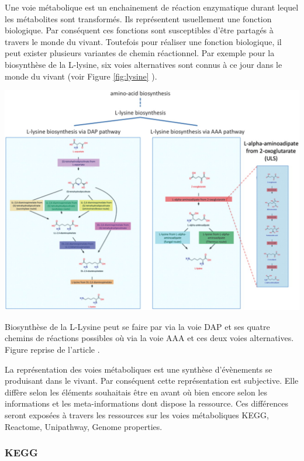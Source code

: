 \begin{refsegment}
    Une voie métabolique est un enchainement de réaction enzymatique durant lequel les métabolites sont transformés. Ils représentent usuellement une fonction biologique. Par conséquent ces fonctions sont susceptibles d'être partagés à travers le monde du vivant. Toutefois pour réaliser une fonction biologique, il peut exister plusieurs variantes de chemin réactionnel. Par exemple pour la biosynthèse de la L-lysine, six voies alternatives sont connus à ce jour dans le monde du vivant (voir Figure \ref{fig:lysine} ).
    	
    	
    	\begin{shadedfigure}[H]
    		\centering
    		\includegraphics[width=\textwidth]{img/L-lysine-biosynthesis.jpg}
    		\caption{Biosynthèse de la L-Lysine peut se faire par via la voie DAP et ses quatre chemins de réactions possibles où via la voie AAA et ces deux voies alternatives. Figure reprise de l'article . }
    		\label{fig:lysine}
    	\end{shadedfigure}
     
     La représentation des voies métaboliques est une synthèse d'évènements se produisant dans le vivant. Par conséquent cette représentation est subjective. Elle diffère selon les éléments souhaitais être en avant où bien encore selon les informations et les meta-informations dont dispose la ressource. Ces différences seront exposées à travers les ressources sur les voies métaboliques KEGG, Reactome, Unipathway, Genome properties.
     
    \subsubsection{KEGG}
    

\end{refsegment}
